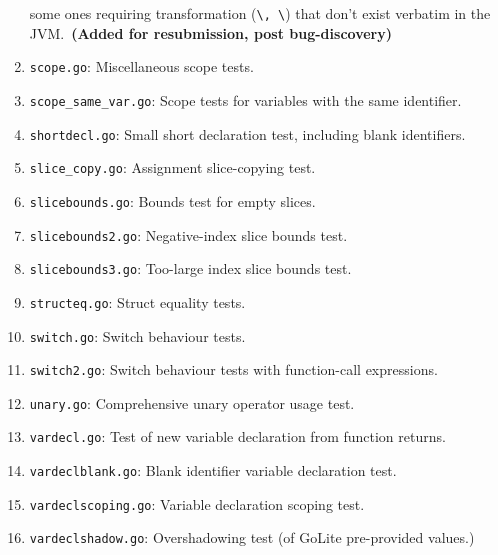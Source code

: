 \documentclass[11pt]{article}
\begin{document}
\begin{enumerate}
  some ones requiring transformation (\texttt{\textbackslash\@a,
    \textbackslash\@v}) that don't exist verbatim in the
  JVM.~\textbf{(Added for resubmission, post bug-discovery)}
\item \texttt{scope.go}: Miscellaneous scope tests.
\item \texttt{scope\_same\_var.go}: Scope tests for variables with the
  same identifier.
\item \texttt{shortdecl.go}: Small short declaration test, including
  blank identifiers.
\item \texttt{slice\_copy.go}: Assignment slice-copying test.
\item \texttt{slicebounds.go}: Bounds test for empty slices.
\item \texttt{slicebounds2.go}: Negative-index slice bounds test.
\item \texttt{slicebounds3.go}: Too-large index slice bounds test.
\item \texttt{structeq.go}: Struct equality tests.
\item \texttt{switch.go}: Switch behaviour tests.
\item \texttt{switch2.go}: Switch behaviour tests with function-call
  expressions.
\item \texttt{unary.go}: Comprehensive unary operator usage test.
\item \texttt{vardecl.go}: Test of new variable declaration from
  function returns.
\item \texttt{vardeclblank.go}: Blank identifier variable declaration
  test.
\item \texttt{vardeclscoping.go}: Variable declaration scoping test.
\item \texttt{vardeclshadow.go}: Overshadowing test (of GoLite
  pre-provided values.)
\end{enumerate}
\end{document}
